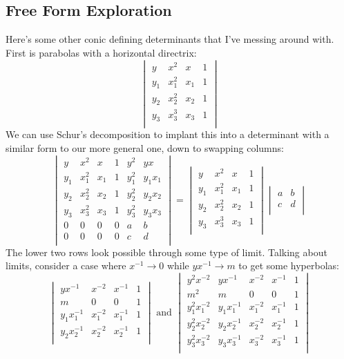 \subsection{Free Form Exploration}
Here's some other conic defining determinants that I've messing around with.
First is parabolas with a horizontal directrix: 
\[\begin{vmatrix}
	y&x^2&x&1\\
	y_1&x_1^2&x_1&1\\
	y_2&x_2^2&x_2&1\\
	y_3&x_3^3&x_3&1\\
\end{vmatrix}\]
We can use Schur's decomposition to implant this into a determinant with a similar form to our more general one, down to swapping columns:
\[\begin{vmatrix}
	y&x^2&x&1&y^2&yx\\
	y_1&x_1^2&x_1&1&y_1^2&y_1x_1\\
	y_2&x_2^2&x_2&1&y_2^2&y_2x_2\\
	y_3&x_3^2&x_3&1&y_3^2&y_3x_3\\
	0&0&0&0&a&b\\
	0&0&0&0&c&d\\
\end{vmatrix}
	=
\begin{vmatrix}
	y&x^2&x&1\\
	y_1&x_1^2&x_1&1\\
	y_2&x_2^2&x_2&1\\
	y_3&x_3^3&x_3&1\\
\end{vmatrix}
\begin{vmatrix}
	a&b\\
	c&d\\
\end{vmatrix}\]
The lower two rows look possible through some type of limit.
Talking about limits,
consider a case where $x^{-1}\rightarrow 0$ while $yx^{-1}\rightarrow m$ to get some hyperbolas:
\[\begin{vmatrix}
	yx^{-1}&x^{-2}&x^{-1}&1\\
	m&0&0&1\\
	y_1x_1^{-1}&x_1^{-2}&x_1^{-1}&1\\
	y_2x_2^{-1}&x_2^{-2}&x_2^{-1}&1\\
\end{vmatrix}
\text{ and }
\begin{vmatrix}
	y^2x^{-2}&yx^{-1}&x^{-2}&x^{-1}&1\\
	m^2&m&0&0&1\\
	y_1^2x_1^{-2}&y_1x_1^{-1}&x_1^{-2}&x_1^{-1}&1\\
	y_2^2x_2^{-2}&y_2x_2^{-1}&x_2^{-2}&x_2^{-1}&1\\
	y_3^2x_3^{-2}&y_3x_3^{-1}&x_3^{-2}&x_3^{-1}&1\\
\end{vmatrix}\]
